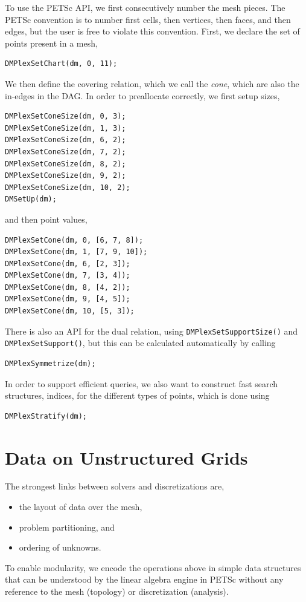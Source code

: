 To use the PETSc API, we first consecutively number the mesh pieces. The PETSc convention is to number first cells,
then vertices, then faces, and then edges, but the user is free to violate this convention. First, we declare the set of
points present in a mesh,
\begin{lstlisting}
DMPlexSetChart(dm, 0, 11);
\end{lstlisting}
We then define the covering relation, which we call the \textit{cone}, which are also the in-edges in the DAG. In order
to preallocate correctly, we first setup sizes,
\begin{lstlisting}
DMPlexSetConeSize(dm, 0, 3);
DMPlexSetConeSize(dm, 1, 3);
DMPlexSetConeSize(dm, 6, 2);
DMPlexSetConeSize(dm, 7, 2);
DMPlexSetConeSize(dm, 8, 2);
DMPlexSetConeSize(dm, 9, 2);
DMPlexSetConeSize(dm, 10, 2);
DMSetUp(dm);
\end{lstlisting}
and then point values,
\begin{lstlisting}
DMPlexSetCone(dm, 0, [6, 7, 8]);
DMPlexSetCone(dm, 1, [7, 9, 10]);
DMPlexSetCone(dm, 6, [2, 3]);
DMPlexSetCone(dm, 7, [3, 4]);
DMPlexSetCone(dm, 8, [4, 2]);
DMPlexSetCone(dm, 9, [4, 5]);
DMPlexSetCone(dm, 10, [5, 3]);
\end{lstlisting}

There is also an API for the dual relation, using \lstinline{DMPlexSetSupportSize()} and \break\lstinline{DMPlexSetSupport()}, but this can be
calculated automatically by calling
\begin{lstlisting}
DMPlexSymmetrize(dm);
\end{lstlisting}
In order to support efficient queries, we also want to construct fast search structures, indices, for the different
types of points, which is done using
\begin{lstlisting}
DMPlexStratify(dm);
\end{lstlisting}

\section{Data on Unstructured Grids} 

The strongest links between solvers and discretizations are,
\begin{itemize}
  \item the layout of data over the mesh,
  \item problem partitioning, and
  \item ordering of unknowns.
\end{itemize}
To enable modularity, we encode the operations above in simple data structures that can be understood by the linear
algebra engine in PETSc without any reference to the mesh (topology) or discretization (analysis).

